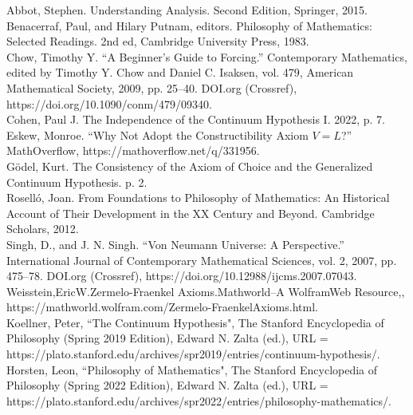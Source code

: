 \documentclass[10pt,letterpaper]{amsart}
\numberwithin{equation}{section}
\theoremstyle{plain}
\theoremstyle{definition}
\numberwithin{equation}{section}
\begin{document}
\begin{thebibliography}{99}

\bibitem{} Abbot, Stephen. Understanding Analysis. Second Edition, Springer, 2015. \\
  
\bibitem{} Benacerraf, Paul, and Hilary Putnam, editors. Philosophy of Mathematics: Selected Readings. 2nd ed, Cambridge University Press, 1983.\\

\bibitem{} Chow, Timothy Y. “A Beginner’s Guide to Forcing.” Contemporary Mathematics, edited by Timothy Y. Chow and Daniel C. Isaksen, vol. 479, American Mathematical Society, 2009, pp. 25–40. DOI.org (Crossref), https://doi.org/10.1090/conm/479/09340.\\

\bibitem{} Cohen, Paul J. The Independence of the Continuum Hypothesis I. 2022, p. 7.\\

\bibitem{} Eskew, Monroe. “Why Not Adopt the Constructibility Axiom $V=L$?” MathOverflow, https://mathoverflow.net/q/331956.\\

\bibitem{} Gödel, Kurt. The Consistency of the Axiom of Choice and the Generalized Continuum Hypothesis. p. 2.\\

\bibitem{} Roselló, Joan. From Foundations to Philosophy of Mathematics: An Historical Account of Their Development in the XX Century and Beyond. Cambridge Scholars, 2012.\\

\bibitem{} Singh, D., and J. N. Singh. “Von Neumann Universe: A Perspective.” International Journal of Contemporary Mathematical Sciences, vol. 2, 2007, pp. 475–78. DOI.org (Crossref), https://doi.org/10.12988/ijcms.2007.07043.\\

\bibitem{} Weisstein,\;Eric\;W.\;Zermelo-Fraenkel Axioms.\;Mathworld--A Wolfram\;Web Resource,,\\https://mathworld.wolfram.com/Zermelo-FraenkelAxioms.html.\\

\bibitem{} Koellner, Peter, ``The Continuum Hypothesis", The Stanford Encyclopedia of Philosophy (Spring 2019 Edition), Edward N. Zalta (ed.), URL = https://plato.stanford.edu/archives/spr2019/entries/continuum-hypothesis/. \\

\bibitem{} Horsten, Leon, ``Philosophy of Mathematics", The Stanford Encyclopedia of Philosophy (Spring 2022 Edition), Edward N. Zalta (ed.), URL = https://plato.stanford.edu/archives/spr2022/entries/philosophy-mathematics/. \\


\end{thebibliography}
\end{document}
